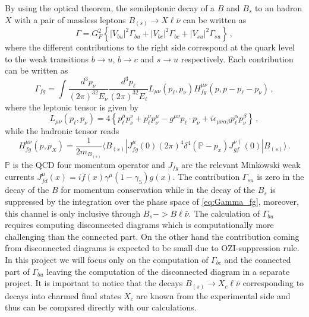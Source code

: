 By using the optical theorem, the semileptonic decay of a $B$ and $B_s$
to an hadron $X$ with a pair of massless leptons $B_{(s)} \to X\ell\bar\nu$ can be written as
\begin{equation}
  \Gamma = G^2_F\left\{ |V_{bu} |^2 \Gamma_{bu} + |V_{bc} |^2 \Gamma_{bc} + |V_{su} |^2 \Gamma_{su}
  \right\}\,,
\end{equation}
where the different contributions to the right side correspond at the quark level
to the weak transitions $b \to u$, $b \to c$ and $s \to u$ respectively.
Each contribution can be written as
\begin{equation}\label{eq:Gamma_fg}
  \Gamma_{fg}=\int \frac{d^3p_\nu}{(2\pi)^32E_\nu}\frac{d^3p_\ell}{(2\pi)^32E_\ell}
  L_{\mu\nu}(p_\ell, p_\nu) H^{\mu\nu}_{fg}(p,p-p_\ell-p_\nu)\,,
\end{equation}
where the leptonic tensor is given by
\begin{equation}
  L_{\mu\nu}(p_\ell, p_\nu) =4\left\{p_\ell^\mu p_\nu^\nu +p_\ell^\nu
  p_\nu^\mu - g^{\mu\nu} p_\ell\cdot p_\nu+
  i\epsilon_{\mu\nu\alpha\beta} p_\ell^\alpha p_\nu^\beta\right\}\,,
\end{equation}
while the hadronic tensor reads
\begin{equation}
  H^{\mu\nu}_{fg}(p,p_X)=\frac{1}{2m_{B_{(s)}}}\langle B_{(s)}| J^\mu_{fg}(0)(2\pi)^4
  \delta^4(\mathbb{P}-p_x) J^{\nu\dagger}_{gf} (0)| B_{(s)}\rangle\,.
\end{equation}
$\mathbb{P}$ is the QCD four momentum operator and $J_{fg}$ are the
relevant Minkowski weak currents $J_{fd}^\mu(x)=i\bar
  f(x)\gamma^\mu(1-\gamma_5)g(x)$.
The contribution $\Gamma_{su}$ is zero in the decay of the $B$ for momentum conservation while  in the decay of the $B_{s}$
is suppressed by the integration over
the phase space of \eqref{eq:Gamma_fg}, moreover, this  channel is only inclusive through $B_s-> B\ell\bar\nu$.
The calculation of $\Gamma_{bu}$  requires computing disconnected diagrams which is computationally more challenging than the connected part.
On the other hand the contribution coming from disconnected diagrams is expected to be small due to OZI-suppression rule.
In this project we will focus only on the computation of $\Gamma_{bc}$ and the connected part of $\Gamma_{bu}$
leaving the computation of the disconnected diagram in a separate project.
It is important to notice that the decays $B_{(s)} \to X_c\ell\bar\nu$ corresponding to decays into charmed final states $X_c$ are known from the experimental side and thus can be compared directly with our calculations.


